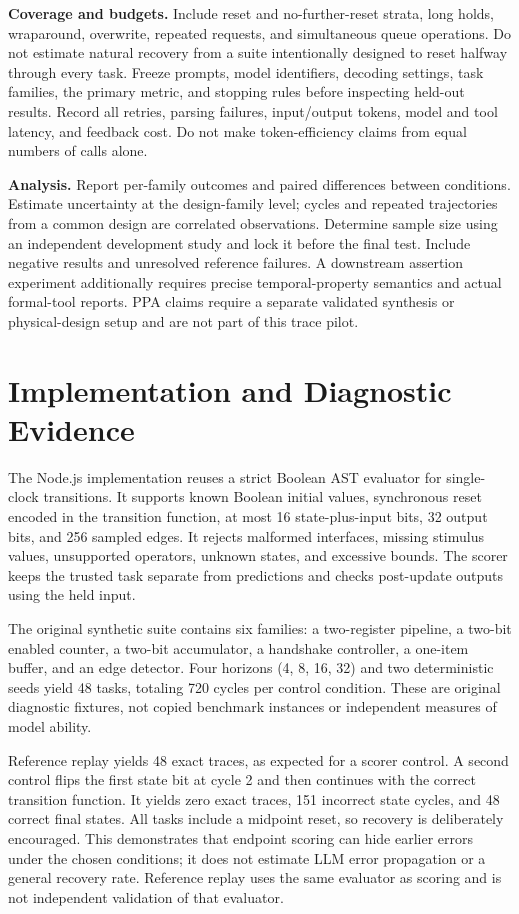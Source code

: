 \documentclass[conference,10pt]{IEEEtran}
\begin{document}
\textbf{Coverage and budgets.} Include reset and no-further-reset strata, long holds, wraparound, overwrite, repeated requests, and simultaneous queue operations. Do not estimate natural recovery from a suite intentionally designed to reset halfway through every task. Freeze prompts, model identifiers, decoding settings, task families, the primary metric, and stopping rules before inspecting held-out results. Record all retries, parsing failures, input/output tokens, model and tool latency, and feedback cost. Do not make token-efficiency claims from equal numbers of calls alone.

\textbf{Analysis.} Report per-family outcomes and paired differences between conditions. Estimate uncertainty at the design-family level; cycles and repeated trajectories from a common design are correlated observations. Determine sample size using an independent development study and lock it before the final test. Include negative results and unresolved reference failures. A downstream assertion experiment additionally requires precise temporal-property semantics and actual formal-tool reports. PPA claims require a separate validated synthesis or physical-design setup and are not part of this trace pilot.

\section{Implementation and Diagnostic Evidence}
The Node.js implementation reuses a strict Boolean AST evaluator for single-clock transitions. It supports known Boolean initial values, synchronous reset encoded in the transition function, at most 16 state-plus-input bits, 32 output bits, and 256 sampled edges. It rejects malformed interfaces, missing stimulus values, unsupported operators, unknown states, and excessive bounds. The scorer keeps the trusted task separate from predictions and checks post-update outputs using the held input.

The original synthetic suite contains six families: a two-register pipeline, a two-bit enabled counter, a two-bit accumulator, a handshake controller, a one-item buffer, and an edge detector. Four horizons (4, 8, 16, 32) and two deterministic seeds yield 48 tasks, totaling 720 cycles per control condition. These are original diagnostic fixtures, not copied benchmark instances or independent measures of model ability.

Reference replay yields 48 exact traces, as expected for a scorer control. A second control flips the first state bit at cycle 2 and then continues with the correct transition function. It yields zero exact traces, 151 incorrect state cycles, and 48 correct final states. All tasks include a midpoint reset, so recovery is deliberately encouraged. This demonstrates that endpoint scoring can hide earlier errors under the chosen conditions; it does not estimate LLM error propagation or a general recovery rate. Reference replay uses the same evaluator as scoring and is not independent validation of that evaluator.
\end{document}
